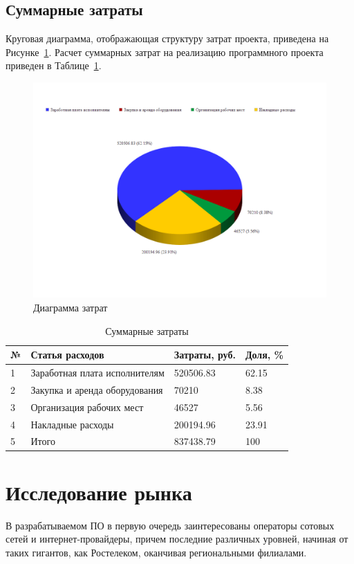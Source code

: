 \subsection{Суммарные затраты}
Круговая диаграмма, отображающая структуру затрат проекта, приведена на Рисунке~\ref{fig:circle_diagram}. Расчет суммарных затрат на реализацию программного проекта приведен в Таблице~\ref{table:all_expenses}.

\begin{figure}
\centering
\includegraphics[scale=0.4]{pictures/circle_diagram}
\caption{Диаграмма затрат}
\label{fig:circle_diagram}
\end{figure}

\begin{table}
\caption{Суммарные затраты}
\label{table:all_expenses}
\begin{tabular} {| l | l | l | l |} 
\hline
№ & Статья расходов & Затраты, руб. & Доля, \%\\
\hline
1 &  Заработная плата исполнителям & 520506.83 & 62.15\\
\hline
2 & Закупка и аренда оборудования & 70210 & 8.38\\
\hline
3 & Организация рабочих мест & 46527 & 5.56\\
\hline
4 & Накладные расходы & 200194.96 & 23.91\\
\hline
5 & Итого & 837438.79 & 100\\
\hline
\end{tabular}
\end{table}


\section{Исследование рынка}
В разрабатываемом ПО в первую очередь заинтересованы операторы сотовых сетей и интернет-провайдеры, причем последние различных уровней, начиная от таких гигантов, как Ростелеком, оканчивая региональными филиалами.

